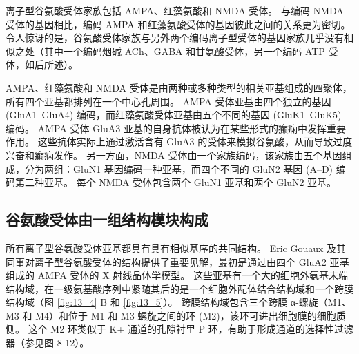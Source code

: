 离子型谷氨酸受体家族包括 AMPA、红藻氨酸和 NMDA 受体。 
与编码 NMDA 受体的基因相比，编码 AMPA 和红藻氨酸受体的基因彼此之间的关系更为密切。 
令人惊讶的是，谷氨酸受体家族与另外两个编码离子型受体的基因家族几乎没有相似之处（其中一个编码烟碱 ACh、GABA 和甘氨酸受体，另一个编码 ATP 受体，如后所述）。


AMPA、红藻氨酸和 NMDA 受体是由两种或多种类型的相关亚基组成的四聚体，所有四个亚基都排列在一个中心孔周围。 
AMPA 受体亚基由四个独立的基因 (GluA1–GluA4) 编码，而红藻氨酸受体亚基由五个不同的基因 (GluK1–GluK5) 编码。
AMPA 受体 GluA3 亚基的自身抗体被认为在某些形式的癫痫中发挥重要作用。 
这些抗体实际上通过激活含有 GluA3 的受体来模拟谷氨酸，从而导致过度兴奋和癫痫发作。 
另一方面，NMDA 受体由一个家族编码，该家族由五个基因组成，分为两组：GluN1 基因编码一种亚基，而四个不同的 GluN2 基因 (A–D) 编码第二种亚基。 
每个 NMDA 受体包含两个 GluN1 亚基和两个 GluN2 亚基。




\subsection{谷氨酸受体由一组结构模块构成}

所有离子型谷氨酸受体亚基都具有具有相似基序的共同结构。
Eric Gouaux 及其同事对离子型谷氨酸受体的结构提供了重要见解，最初是通过由四个 GluA2 亚基组成的 AMPA 受体的 X 射线晶体学模型。 
这些亚基有一个大的细胞外氨基末端结构域，在一级氨基酸序列中紧随其后的是一个细胞外配体结合结构域和一个跨膜结构域（图 \ref{fig:13_4} B 和 \ref{fig:13_5}）。 
跨膜结构域包含三个跨膜 α-螺旋（M1、M3 和 M4）和位于 M1 和 M3 螺旋之间的环 (M2)，该环可进出细胞膜的细胞质侧。 
这个 M2 环类似于 K+ 通道的孔隙衬里 P 环，有助于形成通道的选择性过滤器（参见图 8-12）。

